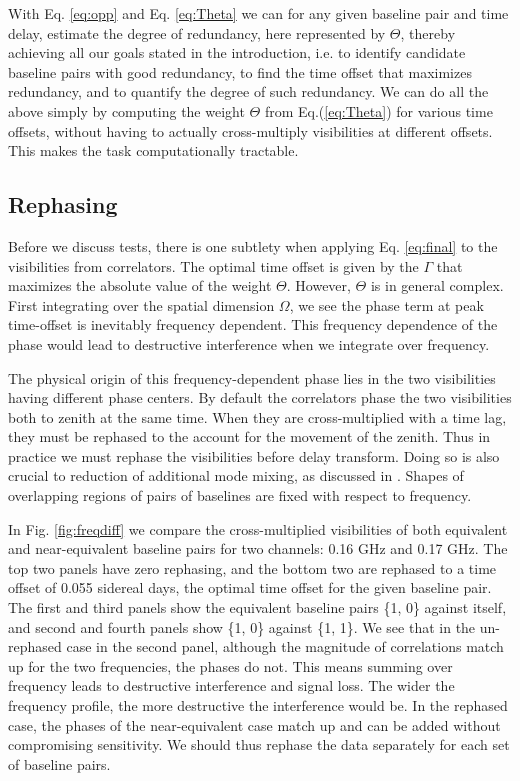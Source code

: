 \documentclass[twocolumn,apj,numberedappendix]{emulateapj}
\renewcommand\[{\begin{equation}}
\renewcommand\]{\end{equation}}
\begin{document}
With Eq. \ref{eq:opp} and Eq. \ref{eq:Theta} we can for any given baseline pair and time delay, estimate the degree of redundancy, here represented by $\Theta$, thereby achieving all our goals stated in the introduction, i.e. to identify 
candidate baseline pairs with good redundancy, to find the time offset that maximizes redundancy, and to quantify the degree of such redundancy. We can do all the above simply by computing the weight $\Theta$ from
Eq.(\ref{eq:Theta}) for various time offsets, without having to actually cross-multiply visibilities at different offsets. This makes the task computationally tractable. 

\subsection{Rephasing \label{sec:rephs}}
Before we discuss tests, there is one subtlety when applying Eq. \ref{eq:final} to the visibilities from correlators. The optimal time offset is given by the $\Gamma$ that maximizes the absolute value of the weight $\Theta$. However, $\Theta$ is in general complex. First integrating over the spatial dimension $\Omega$, we see the phase term at peak time-offset is inevitably frequency dependent. This frequency dependence of the phase would lead to destructive interference when we integrate over frequency.

The physical origin of this frequency-dependent phase lies in the two visibilities having different phase centers. By default the correlators phase the two visibilities  both to zenith at the same time. When they are cross-multiplied with a time lag, they must be rephased to the account for the movement of the zenith. Thus in practice we must rephase the visibilities before delay transform. Doing so is also crucial to reduction of additional mode mixing, as discussed in \cite{Hazelton2013}. Shapes of overlapping regions of pairs of baselines are fixed with respect to frequency. 


In Fig. \ref{fig:freqdiff} we compare the cross-multiplied visibilities of both equivalent and near-equivalent baseline pairs for two channels: 0.16 GHz and 0.17 GHz. The top two panels have zero rephasing, and the bottom two are rephased to a time offset of 0.055 sidereal days, the optimal time offset for the given baseline pair. The first and third panels show the equivalent baseline pairs \{1, 0\} against itself, and second and fourth panels show \{1, 0\} against \{1, 1\}. We see that in the un-rephased case in the second panel, although the magnitude of correlations match up for the two frequencies, the phases do not. This means summing over frequency leads to destructive interference and signal loss. The wider the frequency profile, the more destructive the interference would be. In the rephased case, the phases of the near-equivalent case match up and can be added without compromising sensitivity. We should thus rephase the data separately for each set of baseline pairs. 
\end{document}
